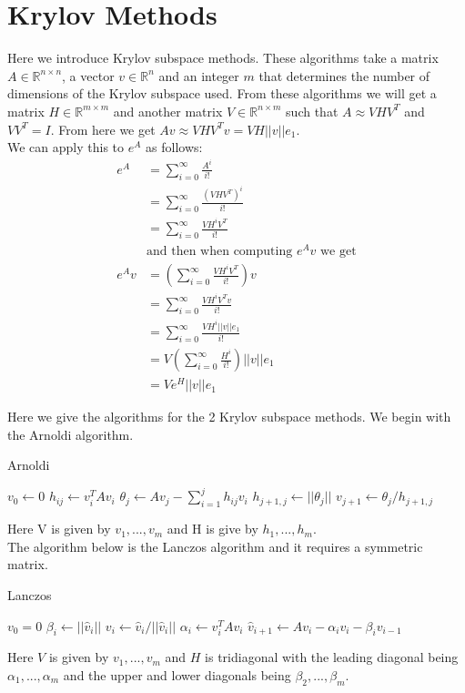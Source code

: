 \section{Krylov Methods}

Here we introduce Krylov subspace methods.
These algorithms take a matrix $A\in \mathbb{R}^{n\times n}$, a vector $v \in \mathbb{R}^n$ and an integer $m$ that determines the number of dimensions of the Krylov subspace used.
From these algorithms we will get a matrix $H \in \mathbb{R}^{m\times m}$ and another matrix $V \in \mathbb{R}^{n\times m}$ such that $A \approx VHV^T$ and $VV^T = I$.
From here we get $Av \approx VHV^Tv = VH||v||e_1$.\\
We can apply this to $e^A$ as follows:
\begin{align*}
e^A &= \sum^{\infty}_{i=0}\frac{A^i}{i!}\\
&= \sum^{\infty}_{i=0}\frac{(VHV^T)^i}{i!} \\
&= \sum^{\infty}_{i=0}\frac{VH^iV^T}{i!} \\
&\text {and then when computing $e^Av$ we get}\\
e^Av &= (\sum^{\infty}_{i=0}\frac{VH^iV^T}{i!})v \\
&= \sum^{\infty}_{i=0}\frac{VH^iV^Tv}{i!} \\
&= \sum^{\infty}_{i=0}\frac{VH^i||v||e_1}{i!} \\
&= V(\sum^{\infty}_{i=0}\frac{H^i}{i!})||v||e_1 \\
&= Ve^H||v||e_1
\end{align*}

Here we give the algorithms for the 2 Krylov subspace methods.
We begin with the Arnoldi algorithm.


\begin{algorithm}[H]
\caption{Arnoldi \cite{Fan2018}} %
\begin{algorithmic}
\State $v_0 \gets 0$
\State$h_{ij} \gets v_i^T A v_i$
\EndFor
\State$\theta_j \gets Av_j - \sum^j_{i=1} h_{ij}v_i$
\State$h_{j+1,j} \gets ||\theta_j||$
\State$v_{j+1} \gets \theta_j/h_{j+1,j}$
\EndFor
\EndProcedure
\end{algorithmic}
\end{algorithm}
Here V is given by $v_1,...,v_m$ and H is give by $h_1,...,h_m$.\\
The algorithm below is the Lanczos algorithm and it requires a symmetric matrix. \cite{Moler2003}
\begin{algorithm}[H]
\caption{Lanczos \cite{OJALVO1970}}
\begin{algorithmic}
\State $v_0 = 0$
\State$\beta_i \gets || \hat v_i ||$
\State$v_i \gets \hat v_i / || \hat v_i ||$
\State$\alpha_i \gets v_i^T A v_i$
\State$\hat v_{i+1} \gets Av_i - \alpha_iv_i - \beta_iv_{i-1}$
\EndFor
\EndProcedure
\end{algorithmic}
\end{algorithm}
Here $V$ is given by ${v_1,...,v_m}$ and $H$ is tridiagonal with the leading diagonal being $\alpha_1, ..., \alpha_m$ and the upper and lower diagonals being $\beta_2,...,\beta_m$.

